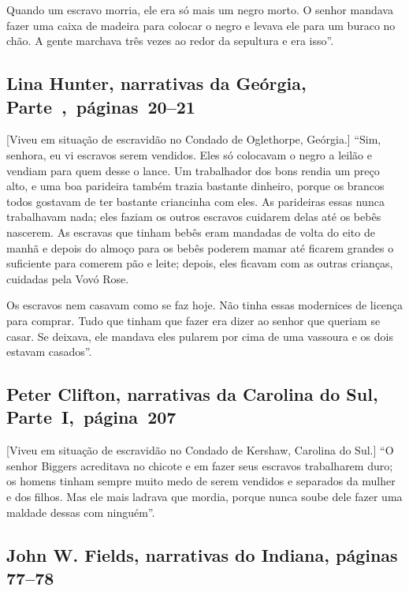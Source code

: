 Quando um escravo morria, ele era só mais um negro morto. O senhor
mandava fazer uma caixa de madeira para colocar o negro e levava ele
para um buraco no chão. A gente marchava três vezes ao redor da
sepultura e era isso''.

\subsection{Lina Hunter, narrativas da Geórgia, Parte~,~páginas~20--21}

{[}Viveu em situação de escravidão no Condado de Oglethorpe, Geórgia.{]} ``Sim, senhora, eu vi escravos serem vendidos. Eles só colocavam o negro
a leilão e vendiam para quem desse o lance. Um trabalhador dos bons
rendia um preço alto, e uma boa parideira também trazia bastante
dinheiro, porque os brancos todos gostavam de ter bastante criancinha
com eles. As parideiras essas nunca trabalhavam nada; eles faziam os
outros escravos cuidarem delas até os bebês nascerem. As escravas que
tinham bebês eram mandadas de volta do eito de manhã e depois do almoço
para os bebês poderem mamar até ficarem grandes o suficiente para
comerem pão e leite; depois, eles ficavam com as outras crianças,
cuidadas pela Vovó Rose.

Os escravos nem casavam como se faz hoje. Não tinha essas modernices de
licença para comprar. Tudo que tinham que fazer era dizer ao senhor que
queriam se casar. Se deixava, ele mandava eles pularem por cima de uma
vassoura e os dois estavam casados''.

\subsection{Peter Clifton, narrativas da Carolina do Sul, Parte~I,~página~207}

{[}Viveu em situação de escravidão no Condado de Kershaw, Carolina do Sul.{]} ``O senhor Biggers acreditava no chicote e em fazer seus escravos
trabalharem duro; os homens tinham sempre muito medo de serem vendidos e
separados da mulher e dos filhos. Mas ele mais ladrava que mordia,
porque nunca soube dele fazer uma maldade dessas com ninguém''.

\subsection{John W. Fields, narrativas do Indiana, páginas 77--78} \label{ref90}

